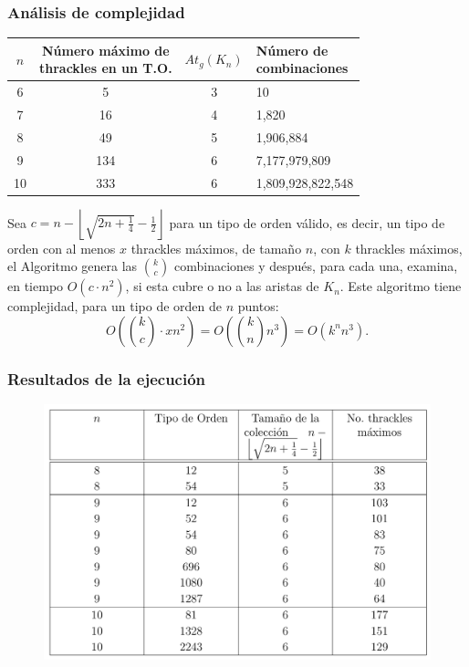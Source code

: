 \begin{frame} \frametitle{Análisis de complejidad}
\begin{table}
	\centering
	\begin{tabular}{|c|c|c|l|}
		\hline
		$n$ & \makecell{Número máximo de \\ thrackles en un T.O.} &$At_g(K_n)$& \makecell{Número de \\      combinaciones} \\
		\hline
		6 & 5 & 3 & 10 \\ \hline
		7 & 16 & 4 & 1,820 \\\hline
		8 & 49 & 5 & 1,906,884 \\\hline
		9 & 134 & 6 & 7,177,979,809 \\\hline
		10 & 333 & 6 & 1,809,928,822,548 \\ \hline
	\end{tabular}
\end{table}
Sea $c=n - \left\lfloor\sqrt{2n + \frac{1}{4}} - \frac{1}{2}\right\rfloor$ para un tipo de orden válido, es decir, un tipo de orden con al menos $x$ thrackles máximos, de tamaño $n$, con $k$ thrackles máximos, el Algoritmo genera las
$\binom{k}{c}$ combinaciones y después, para cada una, examina, en tiempo $O(c \cdot n^2)$, si esta cubre o no a las aristas de $K_n$. Este algoritmo tiene complejidad, para un tipo de orden de $n$ puntos:
\begin{equation*}\displaystyle
O\left(\binom{k}{c}\cdot x n^2 \right) = O \left( \binom{k}{n} n^3 \right) = O(k^n n^3).
\label{complejidad_colecciones}
\end{equation*}
\end{frame}
\begin{frame} \frametitle{Resultados de la ejecución}
\begin{figure}
	\includegraphics[width=1\linewidth]{images/descomposiciones}
\end{figure}
\end{frame}

